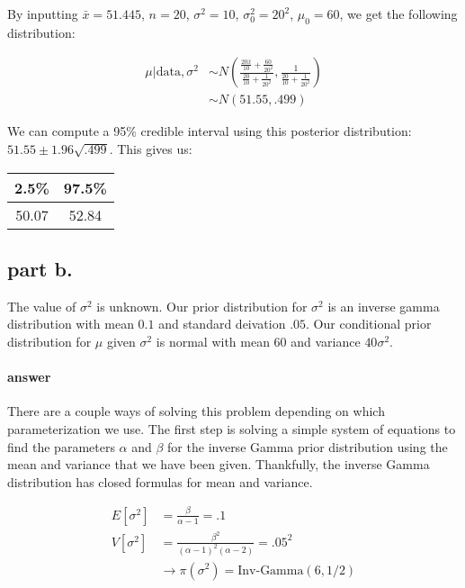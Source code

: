 \documentclass[12pt,a4paper]{article}
\begin{document}
By inputting $\bar{x} = 51.445$, $n = 20$, $\sigma^2 = 10$, $\sigma^2_0 = 20^2$, $\mu_0 = 60$, we get the following distribution:

\begin{align*}
	\mu | \text{data}, \sigma^2 &\sim N\left( \frac{\frac{20\bar{x}}{10} + \frac{60}{20^2}}{\frac{20}{10} + \frac{1}{20^2}}, \frac{1}{\frac{20}{10} + \frac{1}{20^2}}\right) \\
								&\sim N\left( 51.55, .499 \right)
\end{align*}

We can compute a 95\% credible interval using this posterior distribution: $51.55 \pm 1.96 \sqrt{.499}$.
This gives us:

\begin{center}
	\begin{tabular}{|| c | c ||}
		2.5\% & 97.5\% \\
		\hline
		50.07 & 52.84
	\end{tabular}
\end{center}

\subsection{part b.}
The value of $\sigma^2$ is unknown.
Our prior distribution for $\sigma^2$ is an inverse gamma distribution with mean $0.1$ and standard deivation $.05$.
Our conditional prior distribution for $\mu$ given $\sigma^2$ is normal with mean $60$ and variance $40\sigma^2$.

\paragraph{answer}

There are a couple ways of solving this problem depending on which parameterization we use.
The first step is solving a simple system of equations to find the parameters $\alpha $ and $\beta$ for the inverse Gamma prior distribution using the mean and variance that we have been given.
Thankfully, the inverse Gamma distribution has closed formulas for mean and variance.

\begin{align*}
	E[\sigma^2] &= \frac{\beta}{\alpha - 1} = .1 \\
	V[\sigma^2] &= \frac{\beta^2}{(\alpha-1)^2 (\alpha-2)} = .05^2 \\
				&\rightarrow \pi(\sigma^2) = \text{Inv-Gamma}(6, 1/2)
\end{align*}
\end{document}
